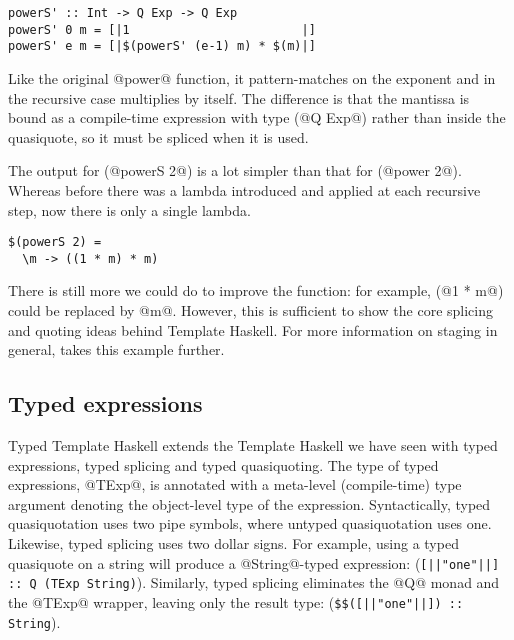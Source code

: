 \begin{lstlisting}
powerS' :: Int -> Q Exp -> Q Exp
powerS' 0 m = [|1                        |]
powerS' e m = [|$(powerS' (e-1) m) * $(m)|]
\end{lstlisting}

Like the original @power@ function, it pattern-matches on the exponent and in the recursive case multiplies by itself.
The difference is that the mantissa is bound as a compile-time expression with type (@Q Exp@) rather than inside the quasiquote, so it must be spliced when it is used.

The output for (@powerS 2@) is a lot simpler than that for (@power 2@).
Whereas before there was a lambda introduced and applied at each recursive step, now there is only a single lambda.

\begin{lstlisting}
$(powerS 2) =
  \m -> ((1 * m) * m)
\end{lstlisting}

There is still more we could do to improve the function: for example, (@1 * m@) could be replaced by @m@.
However, this is sufficient to show the core splicing and quoting ideas behind Template Haskell.
For more information on staging in general, \citet{rompf2010lightweight} takes this example further.

\subsection{Typed expressions}


Typed Template Haskell extends the Template Haskell we have seen with typed expressions, typed splicing and typed quasiquoting.
The type of typed expressions, @TExp@, is annotated with a meta-level (compile-time) type argument denoting the object-level type of the expression.
Syntactically, typed quasiquotation uses two pipe symbols, where untyped quasiquotation uses one.
Likewise, typed splicing uses two dollar signs.
For example, using a typed quasiquote on a string will produce a @String@-typed expression: (\lstinline/[||"one"||] :: Q (TExp String)/).
Similarly, typed splicing eliminates the @Q@ monad and the @TExp@ wrapper, leaving only the result type: (\lstinline/$$([||"one"||]) :: String/).

